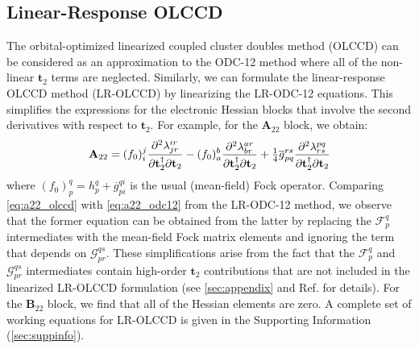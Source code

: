 \subsection{Linear-Response OLCCD}
\label{sec:olccd}
The orbital-optimized linearized coupled cluster doubles method (OLCCD) can be considered as an approximation to the ODC-12 method where all of the non-linear $\mathbf{t}_2$ terms are neglected. Similarly, we can formulate the linear-response OLCCD method (LR-OLCCD) by linearizing the LR-ODC-12 equations. This simplifies the expressions for the electronic Hessian blocks that involve the second derivatives with respect to $\mathbf{t}_2$. For example, for the $\mathbf{A}_{22}$ block, we obtain:
\begin{equation}
    \label{eq:a22_olccd}
    \mathbf{A}_{22}
    =
    (f_0)_i^j
    \dfrac{\partial^2 \lambda^{ir}_{jr}}{%
        \partial\mathbf{t}_2^\dagger
        \partial\mathbf{t}_2
    }
    -
    (f_0)_a^b
    \dfrac{\partial^2 \lambda^{ar}_{br}}{%
        \partial\mathbf{t}_2^\dagger
        \partial\mathbf{t}_2
    }
    +
    \tfrac{1}{4}
    \overline{g}_{pq}^{rs}
    \dfrac{\partial^2 \lambda^{pq}_{rs}}{%
        \partial\mathbf{t}_2^\dagger
        \partial\mathbf{t}_2
    }
\end{equation}
where
\(
    (f_0)_p^q
    =
    h_p^q
    +
    \overline{g}_{pi}^{qi}
\)
is the usual (mean-field) Fock operator.
Comparing \cref{eq:a22_olccd} with \cref{eq:a22_odc12} from the LR-ODC-12
method, we observe that the former equation can be obtained from the latter by
replacing the $\mathcal{F}_p^q$ intermediates with the mean-field Fock matrix
elements and ignoring the term that depends on $\mathcal{G}_{pr}^{qs}$.
These simplifications arise from the fact that the $\mathcal{F}_p^q$ and
$\mathcal{G}_{pr}^{qs}$ intermediates contain high-order $\mathbf{t}_2$
contributions that are not included in the linearized LR-OLCCD formulation (see
\cref{sec:appendix} and Ref.\@ {} for details).
For the $\mathbf{B}_{22}$ block, we find that all of the Hessian elements are
zero.
A complete set of working equations for LR-OLCCD is given in the Supporting
Information (\cref{sec:suppinfo}).


